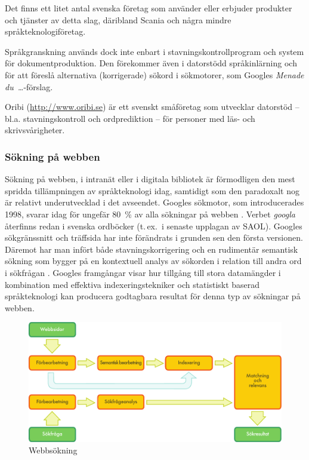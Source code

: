 \begin{multicols}{2}

Det finns ett litet antal svenska företag som använder eller erbjuder
produkter och tjänster av detta slag, däribland Scania och några
mindre språkteknologiföretag.

Språkgranskning används dock inte enbart i
stav\-nings\-kon\-troll\-pro\-gram och system för
dokumentproduktion. Den förekommer även i datorstödd språkinlärning
och för att föreslå alternativa (korrigerade) sökord i sökmotorer, som
Googles \textit{Menade du~\ldots}-förslag.

Oribi (\url{http://www.oribi.se}) är ett svenskt småföretag som
utvecklar datorstöd -- bl.a. stavningskontroll och ordprediktion --
för personer med läs- och skrivsvårigheter.

\subsubsection{Sökning på webben}

Sökning på webben, i intranät eller i digitala bib\-lio\-tek är
förmodligen den mest spridda tillämp\-ning\-en av språkteknologi idag,
samtidigt som den paradoxalt nog är relativt underutvecklad i det
avseendet. Googles sökmotor, som introducerades 1998, svarar idag för
ungefär 80~\% av alla sökningar på webben \cite{spi1}. Verbet
\textit{googla} återfinns redan i svenska ordböcker (t.\,ex.~i senaste
upplagan av SAOL). Googles sökgränssnitt och träffsida har inte
förändrats i grunden sen den första versionen. Däremot har man infört
både stavningskorrigering och en rudimentär semantisk sökning som
bygger på en kontextuell analys av sökorden i relation till andra ord
i sökfrågan \cite{pc1}. Googles framgångar visar hur tillgång till
stora datamängder i kombination med effektiva
in\-dex\-er\-ings\-tek\-nik\-er och statistiskt baserad språkteknologi
kan producera godtagbara resultat för denna typ av sökningar på
webben.

\begin{figure}[htb]
  \center
  \includegraphics[width=\textwidth]{../_media/swedish/web_search_architecture}
  \caption{Webbsökning}
  \label{fig:websearcharch_sv}
\end{figure}


\end{multicols}
